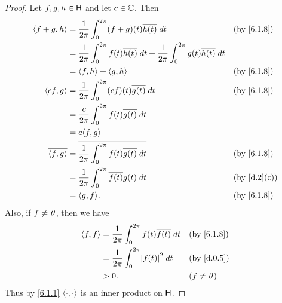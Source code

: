 \begin{proof}
  Let \(f, g, h \in \mathsf{H}\) and let \(c \in \mathbb{C}\).
  Then
  \begin{align*}
    \inn{f + g, h}    & = \dfrac{1}{2 \pi} \int_0^{2 \pi} (f + g)(t) \conj{h(t)} \; dt                                                    &  & \by{6.1.8}  \\
                      & = \dfrac{1}{2 \pi} \int_0^{2 \pi} f(t) \conj{h(t)} \; dt + \dfrac{1}{2 \pi} \int_0^{2 \pi} g(t) \conj{h(t)} \; dt                  \\
                      & = \inn{f, h} + \inn{g, h}                                                                                         &  & \by{6.1.8}  \\
    \inn{cf, g}       & = \dfrac{1}{2 \pi} \int_0^{2 \pi} (cf)(t) \conj{g(t)} \; dt                                                       &  & \by{6.1.8}  \\
                      & = \dfrac{c}{2 \pi} \int_0^{2 \pi} f(t) \conj{g(t)} \; dt                                                                           \\
                      & = c \inn{f, g}                                                                                                                     \\
    \conj{\inn{f, g}} & = \conj{\dfrac{1}{2 \pi} \int_0^{2 \pi} f(t) \conj{g(t)} \; dt}                                                   &  & \by{6.1.8}  \\
                      & = \dfrac{1}{2 \pi} \int_0^{2 \pi} \conj{f(t)} g(t) \; dt                                                          &  & \by{d.2}[c] \\
                      & = \inn{g, f}.                                                                                                     &  & \by{6.1.8}
  \end{align*}
  Also, if \(f \neq \mathit{0}\), then we have
  \begin{align*}
    \inn{f, f} & = \dfrac{1}{2 \pi} \int_0^{2 \pi} f(t) \conj{f(t)} \; dt &  & \by{6.1.8}   \\
               & = \dfrac{1}{2 \pi} \int_0^{2 \pi} \abs{f(t)}^2 \; dt     &  & \by{d.0.5}   \\
               & > 0.                                                     &  & (f \neq \zv)
  \end{align*}
  Thus by \cref{6.1.1} \(\left\langle\cdot, \cdot\right\rangle\) is an inner product on \(\mathsf{H}\).
\end{proof}

